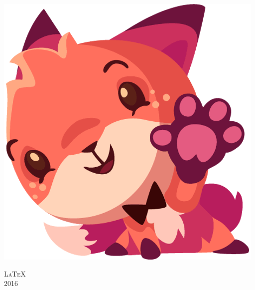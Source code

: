 \begin{titlepage}
\mbox{}

\centerline{
\includegraphics[height=0.3\textheight]{pictures/Foxi/thebeginning}}
\vfill
{\LARGE\scshape \LaTeX}\\[\baselineskip]
{\LARGE\scshape 2016}\par
\restoregeometry
\end{titlepage}
